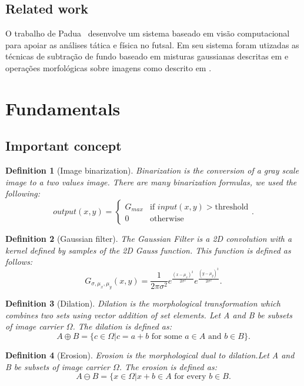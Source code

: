 \documentclass[10pt, conference]{IEEEtran}
\newtheorem{definition}{Definition}
\begin{document}
\subsection{Related work}
O trabalho de Padua~\cite{padua2014sistema} desenvolve um sistema baseado em visão computacional para apoiar as análises tática e física no futsal. Em seu sistema foram utizadas as técnicas de subtração de fundo baseado em misturas gaussianas descritas em \cite{zivkovic2004improved} e operações morfológicas sobre imagens como descrito em \cite{haralick1987image}.

\section{Fundamentals}
\subsection{Important concept}
\begin{definition}[Image binarization]
	Binarization is the conversion of a gray scale image to a two values image. There are many binarization formulas, we used the following:
	\[
		output(x,y) =
	\begin{cases}
		G_{max} & \text{if } input(x,y) > \text{threshold}\\
		0 & \text{otherwise}
	\end{cases}.
	\]
\end{definition}
\begin{definition}[Gaussian filter]
	The Gaussian Filter is a 2D convolution with a kernel defined by samples of the 2D Gauss function. This function is defined as follows:
			$$ G_{\sigma,\mu_{x},\mu_{y}}(x,y)=\frac{1}{2\pi\sigma^{2}}
			e^{\frac{(x-\mu_{x})^{2}}{2\sigma^{2}}}
			e^{\frac{(y-\mu_{y})^{2}}{2\sigma^{2}}}.$$
	
\end{definition}
\begin{definition}[Dilation]
	Dilation is the morphological transformation which combines two sets using vector addition of set elements. Let A and B be subsets of image carrier $\Omega$. The dilation is defined as: $$A \oplus B=\{c\in\Omega|c=a+b \text{ for some }a\in A\text{  and }b \in B\}.$$
\end{definition}

\begin{definition}[Erosion]
Erosion is the morphological dual to dilation.Let A and B be subsets of image carrier $\Omega$. The erosion is defined as: $$A \ominus B=\{x\in\Omega | x+b \in A \text{ for every }b\in B.$$
\end{definition}
\end{document}
